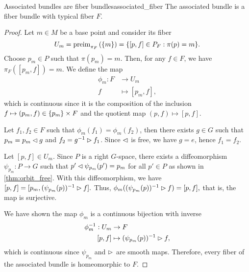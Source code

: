 \begin{proposition}{Associated bundles are fiber bundles}{associated_fiber}
    The associated bundle  is a fiber bundle with typical fiber \(F\).
\end{proposition}
\begin{proof}
    Let \(m \in M\) be a base point and consider its fiber
    \begin{equation*}
        U_m = \operatorname{preim}_{\pi_F}{\left(\{m\}\right)} = \{[p,f] \in P_F : \pi(p) = m\}.
    \end{equation*}
    Choose \(p_m \in P\) such that \(\pi(p_m) = m\). Then, for any \(f \in F\), we have \(\pi_F([p_m, f]) = m\). We define the map
    \begin{align*}
        \phi_m : F &\to U_m\\
                 f &\mapsto [p_m,f],
    \end{align*}
    which is continuous since it is the composition of the inclusion \(f \mapsto (p_m, f) \in \{p_m\} \times F\) and the quotient map \((p,f) \mapsto [p,f]\). 

    Let \(f_1, f_2 \in F\) such that \(\phi_m(f_1) = \phi_m(f_2)\), then there exists \(g \in G\) such that \(p_m = p_m \mathbin{\vartriangleleft} g\) and \(f_2 = g^{-1} \mathbin{\vartriangleright} f_1\). Since \(\mathbin{\vartriangleleft}\) is free, we have \(g = e\), hence \(f_1 = f_2\).

    Let \([p, f] \in U_m\). Since \(P\) is a right \(G\)-space, there exists a diffeomorphism \(\psi_{p_m} : P \to G\) such that \(p' \mathbin{\vartriangleleft} \psi_{p_m}(p') = p_m\) for all \(p' \in P\) as shown in \cref{thm:orbit_free}. With this diffeomorphism, we have \([p,f] = [p_m, (\psi_{p_m}(p))^{-1} \mathbin{\vartriangleright} f].\) Thus, \(\phi_m((\psi_{p_m}(p))^{-1} \mathbin{\vartriangleright} f) = [p,f],\) that is, the map is surjective.

    We have shown the map \(\phi_m\) is a continuous bijection with inverse
    \begin{align*}
        \phi_m^{-1} : U_m &\to F\\
                    [p,f] &\mapsto (\psi_{p_m}(p))^{-1} \mathbin{\vartriangleright} f,
    \end{align*}
    which is continuous since \(\psi_{p_m}\) and \(\mathbin{\vartriangleright}\) are smooth maps. Therefore, every fiber of the associated bundle is homeomorphic to \(F.\)
\end{proof}


